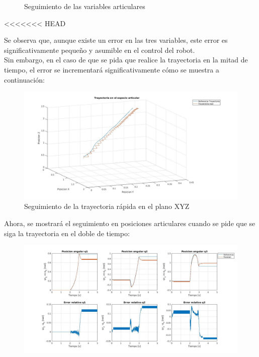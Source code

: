 \begin{itemize}
\begin{figure}[h!]
		\caption{Seguimiento de las variables articulares}
		
	\end{figure}
<<<<<<< HEAD
	
	
	
	\newpage
	
	Se observa que, aunque existe un error en las tres variables, este error es significativamente pequeño y asumible en el control del robot.\\
	
	Sin embargo, en el caso de que se pida que realice la trayectoria en la mitad de tiempo, el error se incrementará significativamente cómo se muestra a continuación:
	
	
	
	\begin{figure}[h!]
		
		\centering
		
		\includegraphics[width=.8\textwidth]{exp4_trayPDidealSR_rapido}
		
		\caption{Seguimiento de la trayectoria rápida en el plano XYZ}
		
	\end{figure}
	
	
	
	\newpage
	
	Ahora, se mostrará el seguimiento en posiciones articulares cuando se pide que se siga la trayectoria en el doble de tiempo:
	
	
	
	\begin{figure}[h!]
		
		\centering
		
		\includegraphics[width=.8\textwidth]{exp4_posPDidealSR_rapido}
		

\end{figure}
\end{itemize}

